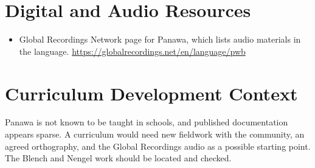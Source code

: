 \documentclass[12pt]{article}
\begin{document}
\section{Digital and Audio Resources}
\begin{itemize}
\item Global Recordings Network page for Panawa, which lists audio materials in the language. \url{https://globalrecordings.net/en/language/pwb}
\end{itemize}

\section{Curriculum Development Context}
Panawa is not known to be taught in schools, and published documentation appears sparse. A curriculum would need new fieldwork with the community, an agreed orthography, and the Global Recordings audio as a possible starting point. The Blench and Nengel work should be located and checked.
\end{document}
